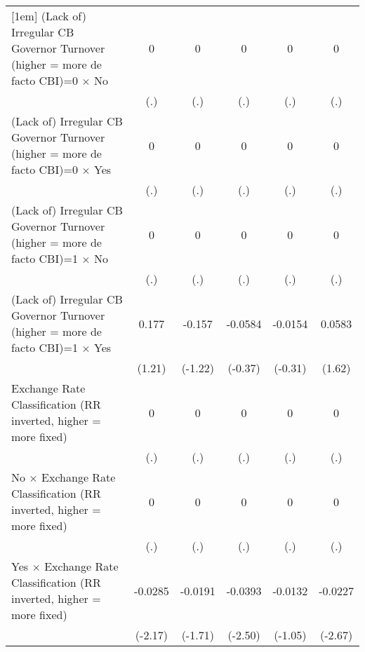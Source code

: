 {\begin{tabular}{l*{5}{c}}
[1em]
(Lack of) Irregular CB Governor Turnover (higher = more de facto CBI)=0 $\times$ No&        0         &        0         &        0         &        0         &        0         \\
                &      (.)         &      (.)         &      (.)         &      (.)         &      (.)         \\
[1em]
(Lack of) Irregular CB Governor Turnover (higher = more de facto CBI)=0 $\times$ Yes&        0         &        0         &        0         &        0         &        0         \\
                &      (.)         &      (.)         &      (.)         &      (.)         &      (.)         \\
[1em]
(Lack of) Irregular CB Governor Turnover (higher = more de facto CBI)=1 $\times$ No&        0         &        0         &        0         &        0         &        0         \\
                &      (.)         &      (.)         &      (.)         &      (.)         &      (.)         \\
[1em]
(Lack of) Irregular CB Governor Turnover (higher = more de facto CBI)=1 $\times$ Yes&    0.177         &   -0.157         &  -0.0584         &  -0.0154         &   0.0583         \\
                &   (1.21)         &  (-1.22)         &  (-0.37)         &  (-0.31)         &   (1.62)         \\
[1em]
Exchange Rate Classification (RR inverted, higher = more fixed)&        0         &        0         &        0         &        0         &        0         \\
                &      (.)         &      (.)         &      (.)         &      (.)         &      (.)         \\
[1em]
No $\times$ Exchange Rate Classification (RR inverted, higher = more fixed)&        0         &        0         &        0         &        0         &        0         \\
                &      (.)         &      (.)         &      (.)         &      (.)         &      (.)         \\
[1em]
Yes $\times$ Exchange Rate Classification (RR inverted, higher = more fixed)&  -0.0285\sym{*}  &  -0.0191         &  -0.0393\sym{*}  &  -0.0132         &  -0.0227\sym{**} \\
                &  (-2.17)         &  (-1.71)         &  (-2.50)         &  (-1.05)         &  (-2.67)         \\

\end{tabular}}
